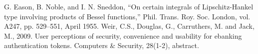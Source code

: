 \documentclass[conference]{IEEEtran}
\begin{document}





\begin{thebibliography}{00}
 G. Eason, B. Noble, and I. N. Sneddon, ``On certain integrals of Lipschitz-Hankel type involving products of Bessel functions,'' Phil. Trans. Roy. Soc. London, vol. A247, pp. 529--551, April 1955.
 Weir, C.S., Douglas, G., Carruthers, M. and Jack, M., 2009. User perceptions of security, convenience and usability for ebanking authentication tokens. Computers \& Security, 28(1-2), abstract.
\end{thebibliography}
\end{document}
